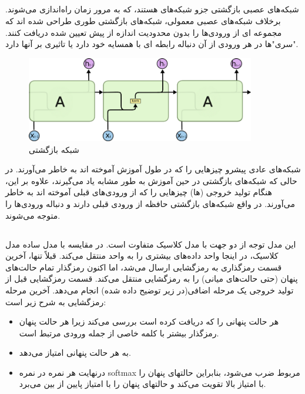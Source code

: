 \subsection{}
شبکه‌های عصبی بازگشتی
جزو شبکه‌های
هستند، که به مرور زمان راه‌اندازی می‌شوند.
برخلاف شبکه‌های عصبی معمولی، شبکه‌های بازگشتی طوری طراحی شده اند که مجموعه ای از ورودی‌ها را بدون محدودیت اندازه از پیش تعیین شده دریافت کنند. "سری"ها در هر ورودی از آن دنباله رابطه ای با همسایه خود دارد یا تاثیری بر آنها دارد.
\begin{figure}[H]
\centering
\includegraphics[width=10cm]{figs/RNN.png}

\caption{  شبکه بازگشتی }\label{RNN}
\label{fig:test}
\end{figure}
شبکه‌های عادی پیشرو چیزهایی را که در طول آموزش آموخته اند به خاطر می‌آورند. در حالی که شبکه‌های بازگشتی در حین آموزش به طور مشابه یاد می‌گیرند، علاوه بر این، هنگام تولید خروجی (ها) چیزهایی را که از ورودی‌های قبلی آموخته اند به خاطر می‌آورند. در واقع شبکه‌های بازگشتی حافظه از ورودی قبلی دارند و دنباله ورودی‌ها را متوجه می‌شوند.
\subsection{}
این مدل
توجه
از دو جهت با مدل کلاسیک متفاوت است.	
در مقایسه با مدل ساده مدل کلاسیک، در اینجا واحد
داده‌های بیشتری را به واحد
منتقل می‌کند. قبلاً تنها، آخرین
قسمت رمزگذاری به رمزگشایی ارسال می‌شد، اما اکنون رمزگذار تمام حالت‌های پنهان (حتی حالت‌های میانی) را به رمزگشایی منتقل می‌کند.
قسمت رمزگشایی قبل از تولید خروجی یک مرحله اضافی(در زیر توضیح داده شده) انجام می‌دهد.
آخرین مرحله رمزگشایی به شرح زیر است:
\begin{itemize}
\item هر حالت پنهانی را که دریافت کرده است بررسی می‌کند زیرا هر حالت پنهان رمزگذار بیشتر با کلمه خاصی از جمله ورودی مرتبط است.
\item به هر حالت پنهانی امتیاز می‌دهد.
\item درنهایت هر نمره در نمره softmax مربوط ضرب می‌شود، بنابراین حالتهای پنهان را با امتیاز بالا تقویت می‌کند و حالتهای پنهان را با امتیاز پایین از بین می‌برد.
\end{itemize}

